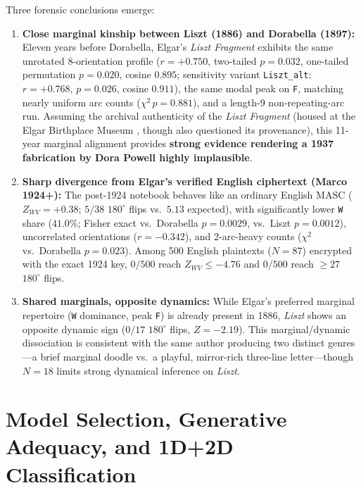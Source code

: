 \documentclass[10pt,a4paper,twocolumn]{article}
\newcommand{\code}[1]{\texttt{\small #1}}
\begin{document}
Three forensic conclusions emerge:
\begin{enumerate}
  \item \textbf{Close marginal kinship between Liszt (1886) and Dorabella (1897):} Eleven years before Dorabella, Elgar's \emph{Liszt Fragment} exhibits the same unrotated 8-orientation profile ($r = +0.750$, two-tailed $p = 0.032$, one-tailed permutation $p = 0.020$, cosine $0.895$; sensitivity variant \code{Liszt\_alt}: $r = +0.768$, $p = 0.026$, cosine $0.911$), the same modal peak on \code{F}, matching nearly uniform arc counts ($\chi^2\,p = 0.881$), and a length-9 non-repeating-arc run. Assuming the archival authenticity of the \emph{Liszt Fragment} (housed at the Elgar Birthplace Museum \citep{bauer2017unsolved}, though \citet{ernst2018cipherbrain} also questioned its provenance), this 11-year marginal alignment provides \textbf{strong evidence rendering a 1937 fabrication by Dora Powell highly implausible}.
  \item \textbf{Sharp divergence from Elgar's verified English ciphertext (Marco 1924+):} The post-1924 notebook behaves like an ordinary English MASC ($Z_{WV} = +0.38$; $5/38$ $180^\circ$ flips vs.\ $5.13$ expected), with significantly lower \code{W} share ($41.0\%$; Fisher exact vs.\ Dorabella $p = 0.0029$, vs.\ Liszt $p = 0.0012$), uncorrelated orientations ($r = -0.342$), and 2-arc-heavy counts ($\chi^2$ vs.\ Dorabella $p = 0.023$). Among 500 English plaintexts ($N=87$) encrypted with the exact 1924 key, \textbf{$0/500$} reach $Z_{WV} \le -4.76$ and \textbf{$0/500$} reach $\ge 27$ $180^\circ$ flips.
  \item \textbf{Shared marginals, opposite dynamics:} While Elgar's preferred marginal repertoire (\code{W} dominance, peak \code{F}) is already present in 1886, \emph{Liszt} shows an opposite dynamic sign ($0/17$ $180^\circ$ flips, $Z = -2.19$). This marginal/dynamic dissociation is consistent with the same author producing two distinct genres---a brief marginal doodle vs.\ a playful, mirror-rich three-line letter---though $N=18$ limits strong dynamical inference on \emph{Liszt}.
\end{enumerate}

\section{Model Selection, Generative Adequacy, and 1D+2D Classification}
\label{sec:models}
\end{document}
